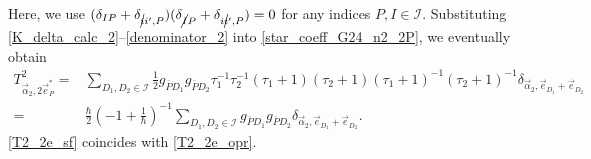 \documentclass[pdftex]{sigma}
\numberwithin{equation}{section}
\begin{document}
Here, we use
$
 (
 \delta_{IP}
 +
 \delta_{\cancel{i}i',P}
 )
 (
 \delta_{\cancel{I}P}
 +
 \delta_{i\cancel{i}',P}
 )
=
0
$
for any indices
$
P,
I
\in
\mathcal{I}
$.
Substituting \eqref{K_delta_calc_2}--\eqref{denominator_2} into \eqref{star_coeff_G24_n2_2P}, we eventually obtain
\begin{align}
T^{2}_{\vec{\alpha}_{2},2\vec{e}_{P}^{\ast}}
={}&
\sum_{
D_{1},D_{2}
\in
\mathcal{I}
}
\frac{1}{2}
g_{\overline{P}D_{1}}
g_{\overline{P}D_{2}}
\tau_{1}^{-1}
\tau_{2}^{-1}
 (
\tau_{1}
+
1
 )
 (
\tau_{2}
+
1
 )
 (
\tau_{1}
+
1
 )^{-1}
 (
\tau_{2}
+
1
 )^{-1}
\delta_{
\vec{\alpha}_{2},
\vec{e}_{D_{1}}
+
\vec{e}_{D_{2}}
}
\nonumber
\\
={}&
\frac{\hbar}{2}
 \left(
-1
+
\frac{1}{\hbar}
 \right)^{-1}
\sum_{
D_{1},D_{2}
\in
\mathcal{I}
}
g_{\overline{P}D_{1}}
g_{\overline{P}D_{2}}
\delta_{
\vec{\alpha}_{2},
\vec{e}_{D_{1}}
+
\vec{e}_{D_{2}}
}
.
\label{T2_2e_sf}
\end{align}
\eqref{T2_2e_sf} coincides with \eqref{T2_2e_opr}.
\end{document}
